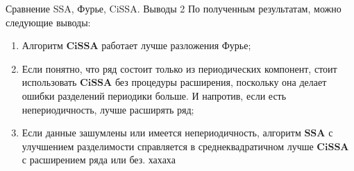 \documentclass[notheorems, handout]{beamer}
\newcommand{\SSA}{\textbf{SSA}}
\newcommand{\CISSA}{\textbf{CiSSA}}
\begin{document}
	
	\begin{frame}{Сравнение SSA, Фурье, CiSSA. Выводы 2}
		По полученным результатам, можно следующие выводы: 
		\begin{enumerate}
			\item Алгоритм $\CISSA$ работает лучше разложения Фурье;
			\item Если понятно, что ряд состоит только из периодических компонент, стоит использовать $\CISSA$ без процедуры расширения, поскольку она делает ошибки разделений периодики больше. И напротив, если есть непериодичность, лучше расширять ряд;
			\item Если данные зашумлены или имеется непериодичность, алгоритм $\SSA$ с улучшением разделимости справляется в среднеквадратичном лучше $\CISSA$ с расширением ряда или без. хахаха
		\end{enumerate}
	\end{frame}
	
	
	
	
	
\end{document}
